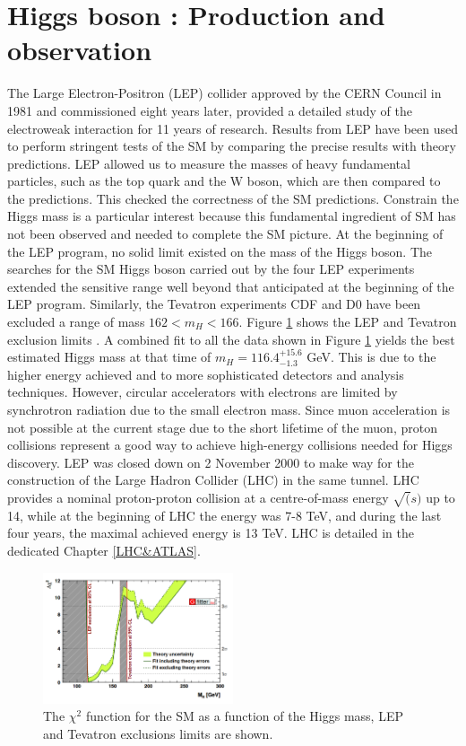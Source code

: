 \section{Higgs boson : Production and observation}
\label{chap1:H2012}
The Large Electron-Positron (LEP) collider approved by the CERN Council in 1981 and commissioned eight years later, provided a detailed study of the electroweak interaction for 11 years of research. Results from LEP have been used to perform stringent tests of the SM by comparing the precise results with theory predictions. LEP allowed us to measure the masses of heavy fundamental particles, such as the top quark and the W boson, which are then compared to the predictions. This checked the correctness of the SM predictions. Constrain the Higgs mass is a particular interest because this fundamental ingredient of SM has not been observed and needed to complete the SM picture. At the beginning of the LEP program, no solid limit existed on the mass of the Higgs boson. The searches for the SM Higgs boson carried out by the four LEP experiments extended the sensitive range well beyond that anticipated at the beginning of the LEP program. Similarly, the Tevatron experiments CDF and D0 have been excluded a range of mass $162 < m_{H} < 166$. Figure \ref{fig:chap1:H2012:LEP} shows the LEP and Tevatron exclusion limits \cite{LEP, Tevatron, LEP_Tevatron}. A combined fit to all the data shown in Figure \ref{fig:chap1:H2012:LEP} yields the best estimated Higgs mass at that time of $m_{H} = 116.4^{+15.6}_{-1.3}$ GeV. This is due to the higher energy achieved and to more sophisticated detectors and analysis techniques. However, circular accelerators with electrons are limited by synchrotron radiation due to the small electron mass. Since muon acceleration is not possible at the current stage due to the short lifetime of the muon, proton collisions represent a good way to achieve high-energy collisions needed for Higgs discovery. LEP was closed down on 2 November 2000 to make way for the construction of the Large Hadron Collider (LHC) in the same tunnel. LHC provides a nominal proton-proton collision at a centre-of-mass energy $\sqrt(s)$ up to 14, while at the beginning of LHC the energy was 7-8 TeV, and during the last four years, the maximal achieved energy is 13 TeV. LHC is detailed in the dedicated Chapter \ref{LHC&ATLAS}. 
\begin{figure}[htbp]
    \centering
    \includegraphics[width=0.5\textwidth]{Ch1/Img/LEP_Tevatron_limits.png}
    \caption{The $\chi^2$ function for the SM as a function of the Higgs mass, LEP and Tevatron exclusions limits are shown.}
    \label{fig:chap1:H2012:LEP}
\end{figure}

